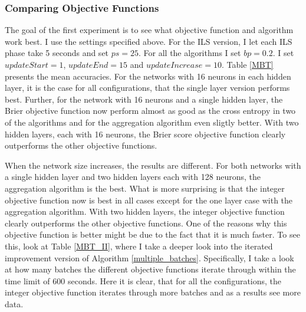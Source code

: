 \subsubsection{Comparing Objective Functions}
The goal of the first experiment is to see what objective function and algorithm work best. I use the settings specified above. For the ILS version, I let each ILS phase take 5 seconds and set $ps=25$. For all the algorithms I set $bp=0.2$. I set $updateStart=1$, $updateEnd=15$ and $updateIncrease=10$. Table \ref{MBT} presents the mean accuracies. For the networks with 16 neurons in each hidden layer, it is the case for all configurations, that the single layer version performs best. Further, for the network with 16 neurons and a single hidden layer, the Brier objective function now perform almost as good as the cross entropy in two of the algorithms and for the aggregation algorithm even sligtly better. With two hidden layers, each with 16 neurons, the Brier score objective function clearly outperforms the other objective functions. 

\noindent When the network size increases, the results are different. For both networks with a single hidden layer and two hidden layers each with 128 neurons, the aggregation algorithm is the best. What is more surprising is that the integer objective function now is best in all cases except for the one layer case with the aggregation algorithm. With two hidden layers, the integer objective function clearly outperforms the other objective functions. One of the reasons why this objective function is better might be due to the fact that it is much faster. To see this, look at Table \ref{MBT_II}, where I take a deeper look into the iterated improvement version of Algorithm \ref{multiple_batches}. Specifically, I take a look at how many batches the different objective functions iterate through within the time limit of 600 seconds. Here it is clear, that for all the configurations, the integer objective function iterates through more batches and as a results see more data. \\

